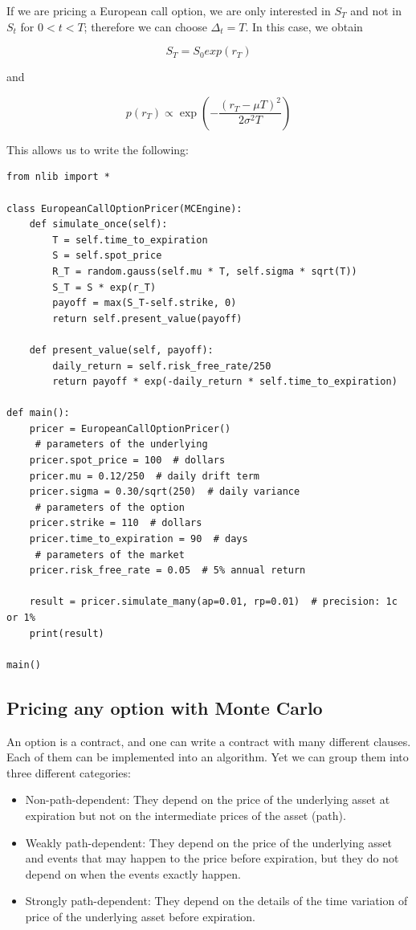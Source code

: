 \documentclass[justified, sixbynine]{tufte-book}
\def\ft{\small\tt}
\theoremstyle{plain}%
\newtheorem * {corollary}{Corollary}
\theoremstyle{definition}
\theoremstyle{remark}
\newtheorem * {remark}{Remark}
\newtheorem * {note}{Note}
\begin{document}
\begin{fullwidth}
If we are pricing a European call option, we are only interested in $S_T$ and not in $S_t$ for $0<t<T$; therefore we can choose $\Delta_t = T$. In this case, we obtain

\begin{equation}
S_T = S_0 exp(r_T)
\end{equation}

and

\begin{equation}
p(r_T) \propto \exp\left(-\frac{(r_T-\mu T)^2}{2\sigma^2 T}\right)
\end{equation}

This allows us to write the following:

\begin{lstlisting}[caption={in file: {\ft options.py}}]
from nlib import * 

class EuropeanCallOptionPricer(MCEngine):
    def simulate_once(self):
        T = self.time_to_expiration
        S = self.spot_price
        R_T = random.gauss(self.mu * T, self.sigma * sqrt(T))
        S_T = S * exp(r_T)
        payoff = max(S_T-self.strike, 0)
        return self.present_value(payoff)

    def present_value(self, payoff):
        daily_return = self.risk_free_rate/250
        return payoff * exp(-daily_return * self.time_to_expiration)

def main():
    pricer = EuropeanCallOptionPricer()
     # parameters of the underlying
    pricer.spot_price = 100  # dollars
    pricer.mu = 0.12/250  # daily drift term
    pricer.sigma = 0.30/sqrt(250)  # daily variance
     # parameters of the option
    pricer.strike = 110  # dollars
    pricer.time_to_expiration = 90  # days
     # parameters of the market
    pricer.risk_free_rate = 0.05  # 5% annual return

    result = pricer.simulate_many(ap=0.01, rp=0.01)  # precision: 1c or 1%
    print(result)

main()
\end{lstlisting}

\goodbreak\subsection{Pricing any option with Monte Carlo}

An option is a contract, and one can write a contract with many different clauses. Each of them can be implemented into an algorithm. Yet we can group them into three different categories:
\begin{itemize}
\item Non-path-dependent: They depend on the price of the underlying asset at expiration but not on the intermediate prices of the asset (path).
\item Weakly path-dependent: They depend on the price of the underlying asset and events that may happen to the price before expiration, but they do not depend on when the events exactly happen.
\item Strongly path-dependent: They depend on the details of the time variation of price of the underlying asset before expiration.
\end{itemize}


\end{fullwidth}
\end{document}
